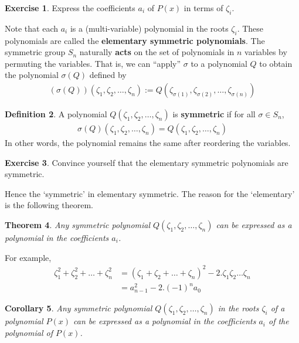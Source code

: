 \documentclass[reqno, 12pt, letter]{article}
\theoremstyle{plain}
\newtheorem{theorem}{Theorem}[section]
\newtheorem{corollary}[theorem]{Corollary}
\theoremstyle{definition}
\newtheorem{definition}[theorem]{Definition}
\newtheorem{exercise}[theorem]{Exercise}
\theoremstyle{remark}
\numberwithin{equation}{section}
\begin{document}
	\begin{exercise}
		Express the coefficients $ a_i$ of $ P(x)$ in terms of $ \zeta_i$.
	\end{exercise}
	Note that each $ a_i$ is a (multi-variable) polynomial in the roots $ \zeta_i$. These polynomials are called the \textbf{elementary symmetric polynomials}.
	The symmetric group $ S_n$ naturally \textbf{acts} on the set of polynomials in $ n$ variables by permuting the variables. 
	That is, we can ``apply'' $\sigma$ to a polynomial $Q$ to obtain the polynomial $\sigma(Q)$ defined by
		\begin{align*}
			(\sigma(Q))(\zeta_1, \zeta_2, \dots, \zeta_n) := Q(\zeta_{\sigma(1)}, \zeta_{\sigma(2)}, \dots, \zeta_{\sigma(n)})
		\end{align*}
		\begin{definition}
			\label{definition:}
			A polynomial $Q(\zeta_1, \zeta_2, \dots, \zeta_n)$ is {\bf symmetric} if for all $\sigma \in S_n $, 
	\begin{align*}
		\sigma(Q) (\zeta_1, \zeta_2, \dots, \zeta_n)= Q(\zeta_1, \zeta_2, \dots, \zeta_n)
	\end{align*}
	In other words, the polynomial remains the same after reordering the variables.
		\end{definition}
		
	\begin{exercise}
		Convince yourself that the elementary symmetric polynomials are symmetric.
	\end{exercise}
	
	Hence the `symmetric' in elementary symmetric. The reason for the `elementary' is the following theorem.
	
	\begin{theorem}
		\label{theorem:fundamental_theorem_symmetric_polynomials}
		Any symmetric polynomial $ Q(\zeta_1, \zeta_2, \dots, \zeta_n)$ can be expressed as a polynomial in the coefficients $ a_i$.
	\end{theorem}
	For example, \begin{align*}
		\zeta_1^2 + \zeta_2^2 + \dots + \zeta_n^2 
		&= (\zeta_1 + \zeta_2 + \dots + \zeta_n)^2 - 2.\zeta_1 \zeta_2 \dots \zeta_n \\
		&= a_{n-1}^2 - 2.(-1)^n a_0
	\end{align*}
	\begin{corollary}
		Any symmetric polynomial $ Q(\zeta_1, \zeta_2, \dots, \zeta_n)$ in the roots $ \zeta_i$ of a polynomial $ P(x)$ can be expressed as a polynomial in the coefficients $ a_i$ of the polynomial of $ P(x)$.
	\end{corollary}
	
\end{document}
